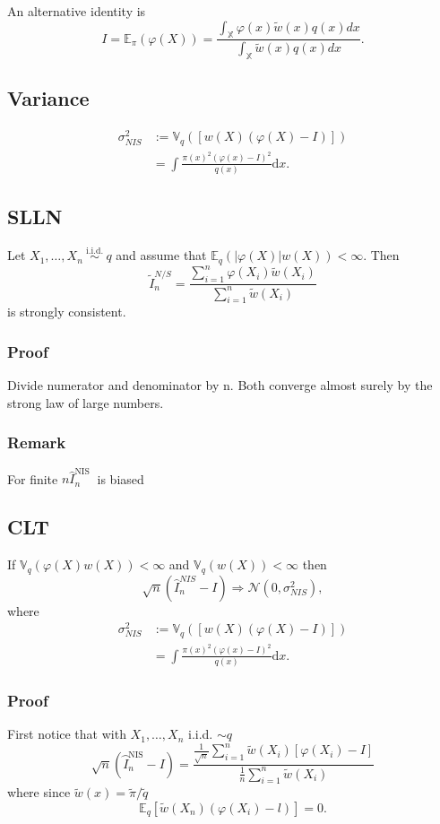 \documentclass{article}
\begin{document}
An alternative identity is
$$
I=\mathbb{E}_\pi(\varphi(X))=\frac{\int_{\mathbb{X}} \varphi(x) \widetilde{w}(x) q(x) d x}{\int_{\mathbb{X}} \widetilde{w}(x) q(x) d x} .
$$
\subsection{Variance}
$$
\begin{aligned}
\sigma_{NIS}^2 & :=\mathbb{V}_q([w(X)(\varphi(X)-I)]) \\
& =\int \frac{\pi(x)^2(\varphi(x)-I)^2}{q(x)} \mathrm{d} x .
\end{aligned}
$$
\subsection{SLLN}
Let $X_1, \ldots, X_n \stackrel{\text { i.i.d. }}{\sim} q$ and assume that $\mathbb{E}_q(|\varphi(X)| w(X))<\infty$. Then
$$
\widetilde{I}_n^{N / S}=\frac{\sum_{i=1}^n \varphi\left(X_i\right) \widetilde{w}\left(X_i\right)}{\sum_{i=1}^n \widetilde{w}\left(X_i\right)}
$$
is strongly consistent.

\subsubsection{Proof}
Divide numerator and denominator by n. Both converge almost surely by the strong law of large numbers. 

\subsubsection{Remark}
For finite $n \widehat{I}_n^{\text {NIS }}$ is biased
\subsection{CLT}
If $\mathbb{V}_q(\varphi(X) w(X))<\infty$ and $\mathbb{V}_q(w(X))<\infty$ then
$$
\sqrt{n}\left(\widehat{I}_n^{N I S}-I\right) \Rightarrow \mathcal{N}\left(0, \sigma_{N I S}^2\right),
$$
where
$$
\begin{aligned}
\sigma_{NIS}^2 & :=\mathbb{V}_q([w(X)(\varphi(X)-I)]) \\
& =\int \frac{\pi(x)^2(\varphi(x)-I)^2}{q(x)} \mathrm{d} x .
\end{aligned}
$$
\subsubsection{Proof}
First notice that with $X_1, \ldots, X_n$ i.i.d. $\sim q$
$$
\sqrt{n}\left(\overparen{I}_n^{\mathrm{NIS}}-I\right)=\frac{\frac{1}{\sqrt{n}} \sum_{i=1}^n \widetilde{w}\left(X_i\right)\left[\varphi\left(X_i\right)-I\right]}{\frac{1}{n} \sum_{i=1}^n \widetilde{w}\left(X_i\right)}
$$
where since $\widetilde{w}(x)=\widetilde{\pi} / \widetilde{q}$
$$
\mathbb{E}_q\left[\widetilde{w}\left(X_n\right)\left(\varphi\left(X_i\right)-l\right)\right]=0 .
$$
\end{document}

